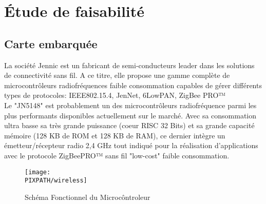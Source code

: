 \section{Étude de faisabilité}

\subsection{Carte embarquée}

La société Jennic est un fabricant  de semi-conducteurs leader dans les solutions de connectivité sans fil. A ce titre, elle propose une gamme complète de microcontrôleurs radiofréquences faible consommation capables de gérer différents types de protocoles: IEEE802.15.4, JenNet, 6LowPAN, ZigBee PRO™\\

Le "JN5148" est probablement un des microcontrôleurs radiofréquence parmi les plus performants disponibles actuellement sur le marché. Avec sa consommation ultra basse sa très grande puissance (coeur RISC 32 Bits) et sa grande capacité mémoire (128 KB de ROM et 128 KB de RAM), ce dernier intègre un émetteur/récepteur radio 2,4 GHz tout indiqué pour la réalisation d'applications avec le protocole ZigBeePRO™ sans fil "low-cost" faible consommation.   \\

\begin{figure}[h]
\centering
\texttt{[image: \\PIXPATH/wireless]}
\caption{\label{Solution Wireless Microcontroller}Schéma Fonctionnel du Microcôntroleur}
\end{figure}

